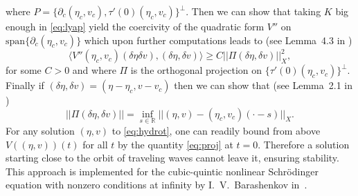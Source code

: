 \documentclass[11pt]{article}
\newcommand{\R}{\mathbb{R}}
\theoremstyle{plain}
\theoremstyle{definition}
\theoremstyle{remark}
\numberwithin{equation}{section}
\begin{document}
{\begin{equation}
	\end{equation}
	where $P=\{\partial_c(\eta_c,v_c), \tau'(0)(\eta_c,v_c)\}^\perp$. Then we can show  that taking $K$ big enough in \eqref{eq:lyap} yield the coercivity of the quadratic form $V''$ on $\mathrm{span}\{\partial_c(\eta_c,v_c)\}$ which upon further computations leads to (see Lemma~4.3 in \cite{stuartstab}) 
	\begin{equation}
		\langle V''(\eta_c,v_c)(\delta\eta\delta v),(\delta\eta,\delta v )\rangle\geq C||\Pi(\delta\eta,\delta v)||_X^2,
	\end{equation}
	for some $C>0$ and where $\Pi$ is the orthogonal projection on $\{\tau'(0)(\eta_c,v_c)\}^\perp$.
	Finally if $(\delta\eta,\delta v)=(\eta-\eta_c,v-v_c)$ then we can show that (see Lemma~2.1 in \cite{stuartstab})
	\begin{equation}\label{eq:proj}
		||\Pi(\delta\eta,\delta v)||=\inf_{s\in\R}||(\eta,v)-(\eta_c,v_c)(\cdot-s)||_X.
	\end{equation} For any solution $(\eta,v)$ to \eqref{eq:hydrot}, one can readily bound from above $V((\eta,v))(t)$ for all $t$ by the quantity \eqref{eq:proj} at $t=0$. Therefore a solution starting close to the orbit of traveling waves cannot leave it, ensuring stability.
		This approach is implemented for the cubic-quintic nonlinear Schr\"odinger equation with nonzero conditions at infinity by I.~V.~Barashenkov in~\cite{barashenkovcrit}.
		
		
}
\end{document}
